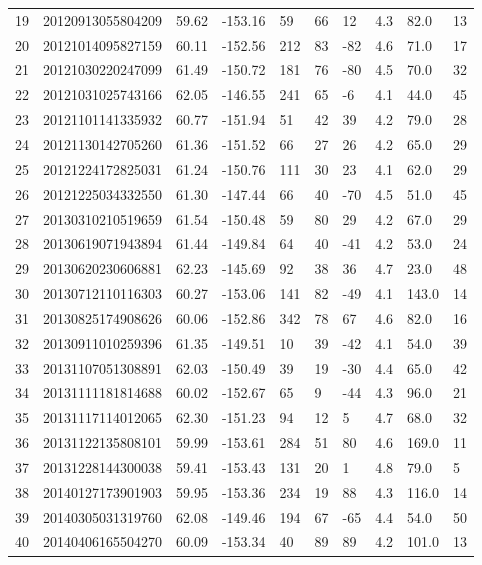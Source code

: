 \documentclass[11pt,titlepage,fleqn]{article}
\begin{document}
\begin{table}[]
\begin{tabular}{llllllllll}
19 & 20120913055804209 & 59.62 & -153.16 &  59 &  66 &  12 & 4.3 & 82.0 & 13 \\ 
20 & 20121014095827159 & 60.11 & -152.56 & 212 &  83 & -82 & 4.6 & 71.0 & 17 \\ 
21 & 20121030220247099 & 61.49 & -150.72 & 181 &  76 & -80 & 4.5 & 70.0 & 32 \\ 
22 & 20121031025743166 & 62.05 & -146.55 & 241 &  65 &  -6 & 4.1 & 44.0 & 45 \\ 
23 & 20121101141335932 & 60.77 & -151.94 &  51 &  42 &  39 & 4.2 & 79.0 & 28 \\ 
24 & 20121130142705260 & 61.36 & -151.52 &  66 &  27 &  26 & 4.2 & 65.0 & 29 \\ 
25 & 20121224172825031 & 61.24 & -150.76 & 111 &  30 &  23 & 4.1 & 62.0 & 29 \\ 
26 & 20121225034332550 & 61.30 & -147.44 &  66 &  40 & -70 & 4.5 & 51.0 & 45 \\ 
27 & 20130310210519659 & 61.54 & -150.48 &  59 &  80 &  29 & 4.2 & 67.0 & 29 \\ 
28 & 20130619071943894 & 61.44 & -149.84 &  64 &  40 & -41 & 4.2 & 53.0 & 24 \\ 
29 & 20130620230606881 & 62.23 & -145.69 &  92 &  38 &  36 & 4.7 & 23.0 & 48 \\ 
30 & 20130712110116303 & 60.27 & -153.06 & 141 &  82 & -49 & 4.1 & 143.0 & 14 \\ 
31 & 20130825174908626 & 60.06 & -152.86 & 342 &  78 &  67 & 4.6 & 82.0 & 16 \\ 
32 & 20130911010259396 & 61.35 & -149.51 &  10 &  39 & -42 & 4.1 & 54.0 & 39 \\ 
33 & 20131107051308891 & 62.03 & -150.49 &  39 &  19 & -30 & 4.4 & 65.0 & 42 \\ 
34 & 20131111181814688 & 60.02 & -152.67 &  65 &   9 & -44 & 4.3 & 96.0 & 21 \\ 
35 & 20131117114012065 & 62.30 & -151.23 &  94 &  12 &   5 & 4.7 & 68.0 & 32 \\ 
36 & 20131122135808101 & 59.99 & -153.61 & 284 &  51 &  80 & 4.6 & 169.0 & 11 \\ 
37 & 20131228144300038 & 59.41 & -153.43 & 131 &  20 &   1 & 4.8 & 79.0 & 5 \\ 
38 & 20140127173901903 & 59.95 & -153.36 & 234 &  19 &  88 & 4.3 & 116.0 & 14 \\ 
39 & 20140305031319760 & 62.08 & -149.46 & 194 &  67 & -65 & 4.4 & 54.0 & 50 \\ 
40 & 20140406165504270 & 60.09 & -153.34 &  40 &  89 &  89 & 4.2 & 101.0 & 13 \\ 

\end{tabular}
\end{table}
\end{document}
